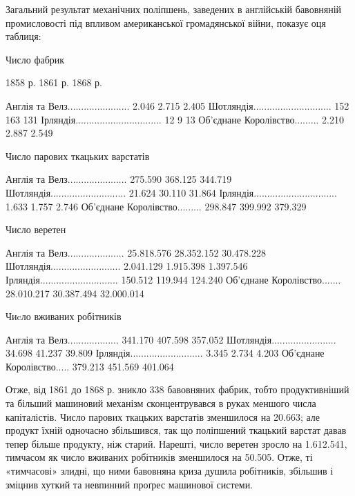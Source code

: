Загальний результат механічних поліпшень, заведених в англійській
бавовняній промисловості під впливом американської
громадянської війни, показує оця таблиця:

Число фабрик

                                                                      1858 р.                       
1861 р.                1868 р.

Англія та Велз.......................                   2.046                          2.715        
          2.405
Шотляндія.............................                   152                               163      
                131
Ірляндія................................                     12                                    9
                        13
Об’єднане Королівство.........                 2.210                            2.887               
   2.549

Число парових ткацьких  варстатів

Англія та Велз......................              275.590                        368.125            
  344.719
Шотляндія............................               21.624                          30.110          
       31.864
Ірляндія...............................                  1.633                            1.757     
              2.746
Об’єднане Королівство.........             298.847                        399.992              
379.329

Число веретен

Англія та Велз.....................       25.818.576                    28.352.152          
30.478.228
Шотляндія..........................          2.041.129                      1.915.398             
1.397.546
Ірляндія.............................              150.512                         119.944          
      124.240
Об’єднане Королівство.......        28.010.217                    30.387.494            32.000.014

Чиcло вживаних робітників

Англія та Велз...................               341.170                          407.598            
    357.052
Шотляндія........................                  34.698                            41.237         
        39.809
Ірляндія...........................                     3.345                              2.734    
               4.203
Об’єднане Королівство.....               379.213                           451.569               
401.064

Отже, від 1861 до 1868 р. зникло 338 бавовняних фабрик, тобто
продуктивніший та більший машиновий механізм сконцентрувався
в руках меншого числа капіталістів. Число парових ткацьких
варстатів зменшилося на 20.663; але продукт їхній одночасно
збільшився, так що поліпшений ткацький варстат давав
тепер більше продукту, ніж старий. Нарешті, число веретен
зросло на 1.612.541, тимчасом як число вживаних робітників
зменшилося на 50.505. Отже, ті «тимчасові» злидні, що ними бавовняна
криза душила робітників, збільшив і зміцнив хуткий
та невпинний проґрес машинової системи.

